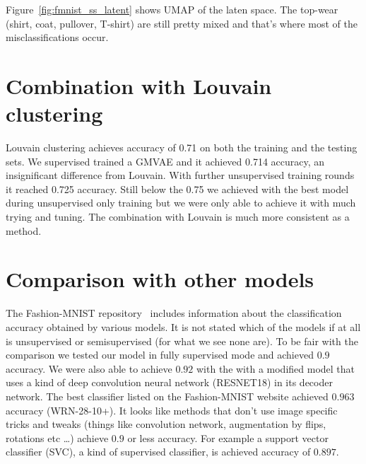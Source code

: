\documentclass[11pt, a4paper]{report}
\theoremstyle{plain}
\theoremstyle{definition}
\theoremstyle{remark}
\begin{document}
Figure~\ref{fig:fmnist_ss_latent} shows UMAP of the laten space.
The top-wear (shirt, coat, pullover, T-shirt) are still pretty mixed and that's
where most of the misclassifications occur.


\section{Combination with Louvain clustering}

Louvain clustering achieves accuracy of 0.71 on both the training and the
testing sets.
We supervised trained a GMVAE and it achieved 0.714 accuracy, an insignificant
difference from Louvain. With further unsupervised training rounds it reached 
0.725 accuracy. Still below the 0.75 we achieved with the best model during 
unsupervised only training but we were only able to
achieve it with much trying and tuning.
The combination with Louvain is much more consistent as a method.


\section{Comparison with other models}

The Fashion-MNIST repository~\cite{fmnist} includes information about the
classification accuracy obtained by various models. It is not stated which of
the models if at all is unsupervised or semisupervised (for what we see none
are). To be fair with the comparison we tested our model in fully supervised
mode and achieved $0.9$ accuracy. We were also able to achieve $0.92$ with the
with a modified model that uses a kind of deep convolution neural network
(RESNET18\cite{he2016deep}) in its decoder network. The best classifier listed on the
Fashion-MNIST website achieved $0.963$ accuracy (WRN-28-10+). It looks like
methods that don't use image specific tricks and tweaks (things like convolution
network, augmentation by flips, rotations etc \dots) achieve $0.9$ or less
accuracy. For example a support vector classifier (SVC), a kind of supervised
classifier, is achieved accuracy of $0.897$.
\end{document}
